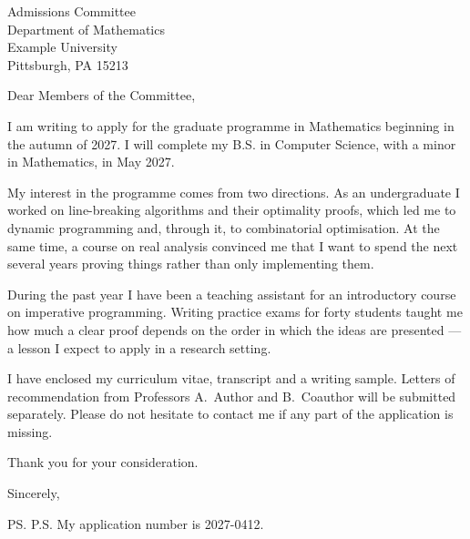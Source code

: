 \documentclass[11pt]{letter}
\date{September 12, 2026}
\begin{document}
\begin{letter}{Admissions Committee\\Department of Mathematics\\Example University\\Pittsburgh, PA 15213}

\opening{Dear Members of the Committee,}

I am writing to apply for the graduate programme in Mathematics beginning
in the autumn of 2027. I will complete my B.S. in Computer Science, with a
minor in Mathematics, in May 2027.

My interest in the programme comes from two directions. As an undergraduate
I worked on line-breaking algorithms and their optimality proofs, which led
me to dynamic programming and, through it, to combinatorial optimisation.
At the same time, a course on real analysis convinced me that I want to
spend the next several years proving things rather than only implementing
them.

During the past year I have been a teaching assistant for an introductory
course on imperative programming. Writing practice exams for forty students
taught me how much a clear proof depends on the order in which the ideas
are presented --- a lesson I expect to apply in a research setting.

I have enclosed my curriculum vitae, transcript and a writing sample.
Letters of recommendation from Professors A.~Author and B.~Coauthor will be
submitted separately. Please do not hesitate to contact me if any part of
the application is missing.

Thank you for your consideration.

\closing{Sincerely,}

\ps{P.S. My application number is 2027-0412.}

\end{letter}
\end{document}
